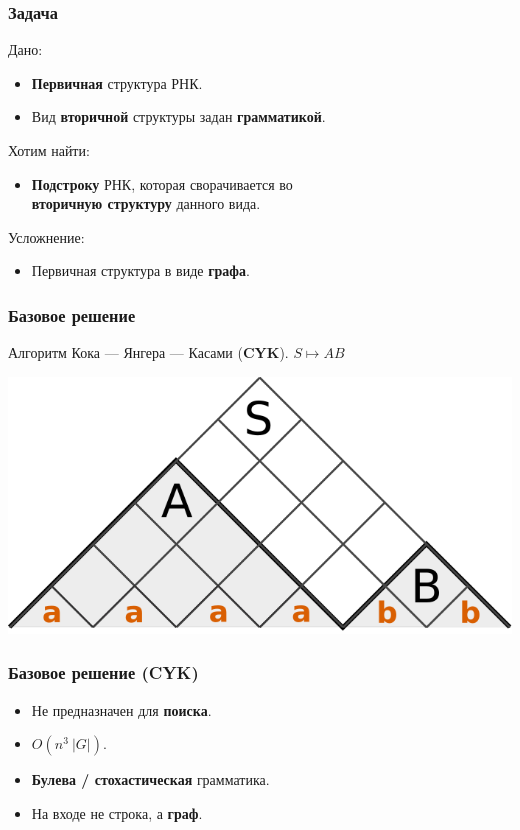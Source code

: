 \documentclass[28pt,pdf,hyperref={unicode}]{beamer}
\renewcommand{\emph}[1]{\textbf{\color{memph}#1}}
\begin{document}
\begin{frame}
\frametitle{Задача}

Дано:
\begin{itemize}
\setlength\itemsep{0.5em}
\item \emph{Первичная} структура РНК.
\item Вид \emph{вторичной} структуры задан \emph{грамматикой}.
\end{itemize}
\vskip12pt

Хотим найти:
\begin{itemize}
\setlength\itemsep{0.5em}
\item \emph{Подстроку} РНК, которая сворачивается во \\ \emph{вторичную структуру} данного вида.
\end{itemize}
\vskip12pt

Усложнение:
\begin{itemize}
\setlength\itemsep{0.5em}
\item Первичная структура в виде \emph{графа}.
\end{itemize}
\end{frame}



\begin{frame}
\frametitle{Базовое решение}

Алгоритм Кока — Янгера — Касами (\emph{CYK}).
\vskip50pt
{\Large $S \mapsto AB$}

\begin{center}
\vskip-30pt
\includegraphics[width=.8\textwidth]{pics/drawing.png}
\end{center}

\end{frame}


\begin{frame}
\frametitle{Базовое решение (\emph{CYK})}

\begin{itemize}
\setlength\itemsep{0.5em}
\item {\color{mgreen}Не предназначен для \textbf{поиска}.}
\item {\color{mred}$O\left(n^3\ |G|\right)$.}
\item {\color{mred}\textbf{Булева / стохастическая} грамматика.}
\item {\color{mred}На входе не строка, а \textbf{граф}.}
\end{itemize}
\end{frame}
\end{document}

